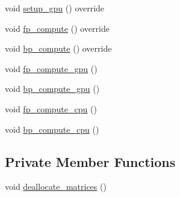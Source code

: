 \begin{DoxyCompactItemize}
\item 
void \hyperlink{classlbann_1_1batch__normalization_ab4737c3efcafa9bff1e68084b7f36283}{setup\+\_\+gpu} () override
\item 
void \hyperlink{classlbann_1_1batch__normalization_a92ad52396d7083c84ec20016ad5e994b}{fp\+\_\+compute} () override
\item 
void \hyperlink{classlbann_1_1batch__normalization_ad9aedd689cd8923d8c8e9c4e57a4e8b7}{bp\+\_\+compute} () override
\item 
void \hyperlink{classlbann_1_1batch__normalization_aacff2c47a5455a4c28b9695f4fb37249}{fp\+\_\+compute\+\_\+gpu} ()
\item 
void \hyperlink{classlbann_1_1batch__normalization_a7d48ad1531825fc9745c77f9ae5f68d6}{bp\+\_\+compute\+\_\+gpu} ()
\item 
void \hyperlink{classlbann_1_1batch__normalization_ae4cad47f456752e4ea20add0f6f38819}{fp\+\_\+compute\+\_\+cpu} ()
\item 
void \hyperlink{classlbann_1_1batch__normalization_a83e40edd001a0b71c31fbc9a3acb2231}{bp\+\_\+compute\+\_\+cpu} ()
\end{DoxyCompactItemize}
\subsection*{Private Member Functions}
\begin{DoxyCompactItemize}
\item 
void \hyperlink{classlbann_1_1batch__normalization_ac98f8fbb6e5ea998a06cef2c2cac9f03}{deallocate\+\_\+matrices} ()
\end{DoxyCompactItemize}
